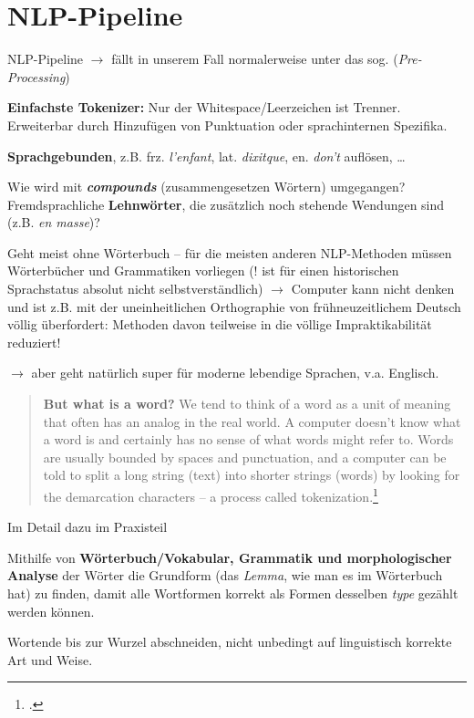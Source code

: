 \documentclass[10pt]{beamer}
\begin{document}
\section{NLP-Pipeline}
\begin{frame}[allowframebreaks]{NLP-Pipeline}
$\to$ fällt in unserem Fall normalerweise unter das sog. (\emph{Pre-Processing})

\textbf{Einfachste Tokenizer:} Nur der Whitespace/Leerzeichen ist Trenner. Erweiterbar durch Hinzufügen von Punktuation oder sprachinternen Spezifika.

\textbf{Sprachgebunden}, z.B. frz. \emph{l'enfant}, lat. \emph{dixitque}, en. \emph{don't} auflösen, \dots 

Wie wird mit \textbf{\emph{compounds}} (zusammengesetzen Wörtern) umgegangen?
Fremdsprachliche \textbf{Lehnwörter}, die zusätzlich noch stehende Wendungen sind (z.B. \emph{en masse})?

Geht meist ohne Wörterbuch -- für die meisten anderen NLP-Methoden müssen Wörterbücher und Grammatiken vorliegen (! ist für einen historischen Sprachstatus absolut nicht selbstverständlich) $\to$ Computer kann nicht denken und ist z.B. mit der uneinheitlichen Orthographie von frühneuzeitlichem Deutsch völlig überfordert: Methoden davon teilweise in die völlige Impraktikabilität reduziert! 

$\to$ aber geht natürlich super für moderne lebendige Sprachen, v.a. Englisch.

\begin{quote}
    \textbf{But what is a word?} We tend to think of a word as a unit of meaning that often has an analog in the real world. \punkti A computer doesn't know what a word is and certainly has no sense of what words might refer to.
    \punkti 
    Words are usually bounded by spaces and punctuation, and a computer can be told to split a long string (text) into shorter strings (words) by looking for the demarcation characters \punkti -- a process called tokenization.\footcite[283]{textvisual}
\end{quote}
\end{frame}


\begin{frame}[allowframebreaks]{Im Detail dazu im Praxisteil}

 Mithilfe von \textbf{Wörterbuch/Vokabular, Grammatik und morphologischer Analyse} der Wörter die Grundform (das \emph{Lemma}, wie man es im Wörterbuch hat) zu finden, damit alle Wortformen korrekt als Formen desselben \emph{type} gezählt werden können.

 Wortende bis zur Wurzel abschneiden, nicht unbedingt auf linguistisch korrekte Art und Weise.



\end{frame}
\end{document}

